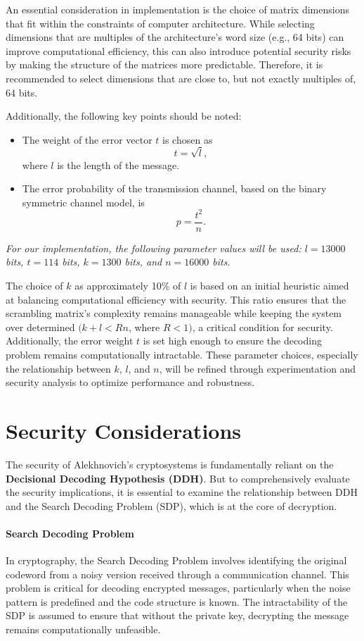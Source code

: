 An essential consideration in implementation is the choice of matrix dimensions that fit within the constraints of computer architecture. While selecting dimensions that are multiples of the architecture's word size (e.g., 64 bits) can improve computational efficiency, this can also introduce potential security risks by making the structure of the matrices more predictable. Therefore, it is recommended to select dimensions that are close to, but not exactly multiples of, 64 bits.

Additionally, the following key points should be noted:
\begin{itemize}
    \item The weight of the error vector $t$ is chosen as $$t = \sqrt{l},$$ where $l$ is the length of the message.
    \item The error probability of the transmission channel, based on the binary symmetric channel model, is $$p = \frac{t^2}{n}.$$
\end{itemize}

\textit{For our implementation, the following parameter values will be used: $ l = 13000 $ bits, $ t = 114 $ bits, $ k = 1300 $ bits, and $ n = 16000 $ bits.}

The choice of $ k $ as approximately 10\% of $ l $ is based on an initial heuristic aimed at balancing computational efficiency with security. This ratio ensures that the scrambling matrix's complexity remains manageable while keeping the system over determined $( k + l < Rn $, where $ R < 1)$, a critical condition for security. Additionally, the error weight $ t $ is set high enough to ensure the decoding problem remains computationally intractable. These parameter choices, especially the relationship between $ k $, $ l $, and $ n $, will be refined through experimentation and security analysis to optimize performance and robustness.


\section{Security Considerations}

The security of Alekhnovich's cryptosystems is fundamentally reliant on the \textbf{Decisional Decoding Hypothesis (DDH)}. But to comprehensively evaluate the security implications, it is essential to examine the relationship between DDH and the Search Decoding Problem (SDP), which is at the core of decryption.

\paragraph{Search Decoding Problem}
In cryptography, the Search Decoding Problem involves identifying the original codeword from a noisy version received through a communication channel. This problem is critical for decoding encrypted messages, particularly when the noise pattern is predefined and the code structure is known. The intractability of the SDP is assumed to ensure that without the private key, decrypting the message remains computationally unfeasible.

